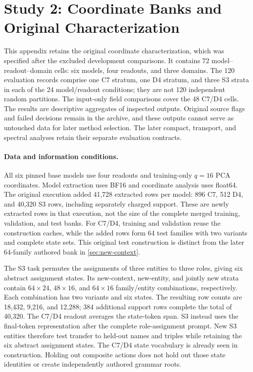 \section{Study 2: Coordinate Banks and Original Characterization}
\label{app:characterization}

This appendix retains the original coordinate characterization,
which was specified after the excluded development comparisons.
It contains 72 model--readout--domain cells:
six models, four readouts, and three domains.
The 120 evaluation records comprise one C7 stratum, one D4
stratum, and three S3 strata in each of the 24 model/readout
conditions; they are not 120 independent random partitions.
The input-only field comparisons cover the 48 C7/D4 cells.
The results are descriptive aggregates of inspected outputs.
Original source flags and failed decisions remain in the archive,
and these outputs cannot serve as untouched data for later
method selection.
The later compact, transport, and spectral analyses retain
their separate evaluation contracts.

\paragraph{Data and information conditions.}
All six pinned base models use four readouts and training-only
$q=16$ PCA coordinates.
Model extraction uses BF16 and coordinate analysis uses float64.
The original execution added 41,728 extracted rows per model:
896 C7, 512 D4, and 40,320 S3 rows, including separately charged
support.
These are newly extracted rows in that execution, not the size
of the complete merged training, validation, and test banks.
For C7/D4, training and validation reuse the construction
caches, while the added rows form 64 test families with two
variants and complete state sets.
This original test construction is distinct from the later
64-family authored bank in \cref{sec:new-context}.

The S3 task permutes the assignments of three entities to
three roles, giving six abstract assignment states.
Its new-context, new-entity, and jointly new strata contain
$64\times24$, $48\times16$, and $64\times16$ family/entity
combinations, respectively.
Each combination has two variants and six states.
The resulting row counts are 18,432, 9,216, and 12,288;
384 additional support rows complete the total of 40,320.
The C7/D4 readout averages the state-token span.
S3 instead uses the final-token representation after the
complete role-assignment prompt.
New S3 entities therefore test transfer to held-out names
and triples while retaining the six abstract assignment states.
The C7/D4 state vocabulary is already seen in construction.
Holding out composite actions does not hold out those state
identities or create independently authored grammar roots.

